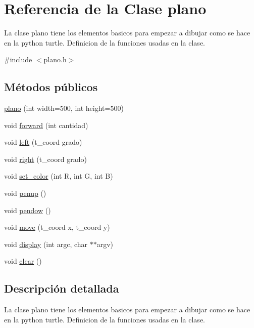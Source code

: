 \hypertarget{classplano}{}\section{Referencia de la Clase plano}
\label{classplano}


La clase plano tiene los elementos basicos para empezar a dibujar como se hace en la python turtle.  Definicion de la funciones usadas en la clase.  




{\ttfamily \#include $<$plano.\+h$>$}

\subsection*{Métodos públicos}
\begin{DoxyCompactItemize}
\item 
\hyperlink{classplano_a07a6173550219cbe2d32925afac542a5}{plano} (int width=500, int height=500)
\item 
void \hyperlink{classplano_a2febab8f233098b881ced3f4553526f2}{forward} (int cantidad)
\item 
void \hyperlink{classplano_ad5f11338792271b961051f7eff80c4cc}{left} (t\+\_\+coord grado)
\item 
void \hyperlink{classplano_a350bd814b14e4a876b601e608c4b7217}{right} (t\+\_\+coord grado)
\item 
void \hyperlink{classplano_a5758a4e96e2140941dd150e91e6029fd}{set\+\_\+color} (int R, int G, int B)
\item 
void \hyperlink{classplano_a48e4fbc9361ecaffe8a18545825ae19b}{penup} ()
\item 
void \hyperlink{classplano_aa2ae0a48000f85adfc61663ae7011aa2}{pendow} ()
\item 
void \hyperlink{classplano_a87e7fce6efc52d9b8c1e0c8946b1c2bb}{move} (t\+\_\+coord x, t\+\_\+coord y)
\item 
void \hyperlink{classplano_aa17e44a9925d265425e883f3bd8c1565}{display} (int argc, char $\ast$$\ast$argv)
\item 
void \hyperlink{classplano_af182fef3457cdab6f0b64b41d98b4edf}{clear} ()
\end{DoxyCompactItemize}


\subsection{Descripción detallada}
La clase plano tiene los elementos basicos para empezar a dibujar como se hace en la python turtle.  Definicion de la funciones usadas en la clase. 

